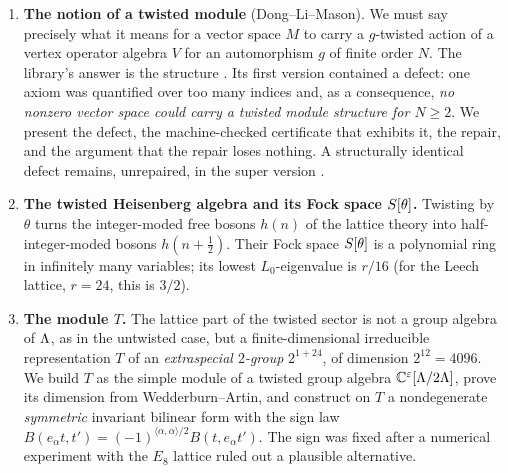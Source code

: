 \begin{enumerate}[label=(\Roman*)]
\item \textbf{The notion of a twisted module} (Dong--Li--Mason).  We must say precisely what it
  means for a vector space $M$ to carry a $g$-twisted action of a vertex operator algebra $V$ for
  an automorphism $g$ of finite order $N$.  The library's answer is the structure
  .  Its first version contained a defect: one axiom was quantified over
  too many indices and, as a consequence, \emph{no nonzero vector space could carry a twisted
  module structure for $N\ge 2$}.  We present the defect, the machine-checked certificate that
  exhibits it, the repair, and the argument that the repair loses nothing.  A structurally
  identical defect remains, unrepaired, in the super version .
\item \textbf{The twisted Heisenberg algebra and its Fock space $S[\theta]$.}  Twisting by $\theta$
  turns the integer-moded free bosons $h(n)$ of the lattice theory into half-integer-moded bosons
  $h(n+\tfrac12)$.  Their Fock space $S[\theta]$ is a polynomial ring in infinitely many variables;
  its lowest $L_0$-eigenvalue is $r/16$ (for the Leech lattice, $r=24$, this is $3/2$).
\item \textbf{The module $T$.}  The lattice part of the twisted sector is not a group algebra of
  ${\Lambda}$, as in the untwisted case, but a finite-dimensional irreducible representation $T$ of an
  \emph{extraspecial $2$-group} $2^{1+24}$, of dimension $2^{12}=4096$.  We build $T$ as the simple
  module of a twisted group algebra ${\mathbb{C}}^\varepsilon[{\Lambda}/2{\Lambda}]$, prove its dimension from
  Wedderburn--Artin, and construct on $T$ a nondegenerate \emph{symmetric} invariant bilinear form
  with the sign law $B(e_\alpha t,t') = (-1)^{\langle\alpha,\alpha\rangle/2}B(t,e_\alpha t')$.  The
  sign was fixed after a numerical experiment with the $E_8$ lattice ruled out a plausible
  alternative.
\end{enumerate}

